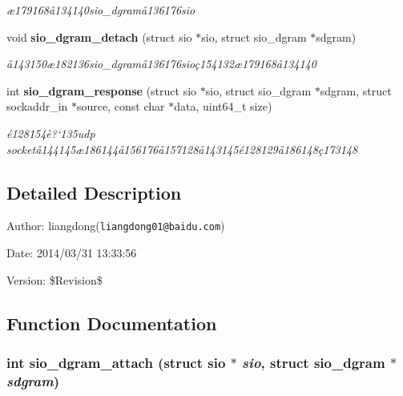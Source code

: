 \begin{CompactItemize}
\begin{CompactList}\small\item\em \ae{}179168\aa{}134140sio\_\-dgram\aa{}136176sio \item\end{CompactList}\item 
void {\bf sio\_\-dgram\_\-detach} (struct sio $\ast$sio, struct sio\_\-dgram $\ast$sdgram)
\begin{CompactList}\small\item\em \aa{}143150\ae{}182136sio\_\-dgram\aa{}136176sio\c{c}154132\ae{}179168\aa{}134140 \item\end{CompactList}\item 
int {\bf sio\_\-dgram\_\-response} (struct sio $\ast$sio, struct sio\_\-dgram $\ast$sdgram, struct sockaddr\_\-in $\ast$source, const char $\ast$data, uint64\_\-t size)
\begin{CompactList}\small\item\em \'{e}128154\`{e}?`135udp socket\aa{}144145\ae{}186144\aa{}156176\aa{}157128\aa{}143145\'{e}128129\aa{}186148\c{c}173148 \item\end{CompactList}\end{CompactItemize}


\subsection{Detailed Description}
\begin{Desc}
\item[Author:]liangdong({\tt liangdong01@baidu.com}) \end{Desc}
\begin{Desc}
\item[Date:]2014/03/31 13:33:56 \end{Desc}
\begin{Desc}
\item[Version:]\$Revision\$ \end{Desc}


\subsection{Function Documentation}
\subsubsection{\setlength{\rightskip}{0pt plus 5cm}int sio\_\-dgram\_\-attach (struct sio $\ast$ {\em sio}, struct sio\_\-dgram $\ast$ {\em sdgram})}\label{sio__dgram_8c_a6}


